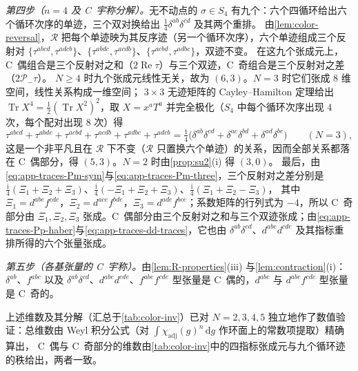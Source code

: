 \documentclass[UTF8,a4paper,11pt,fontset=fandol]{ctexart}
\makeatletter
\theoremstyle{cplain}
\theoremstyle{cdefinition}
\theoremstyle{cremark}
\renewcommand{\proofname}{证明}
\renewenvironment{proof}[1][\proofname]{\par\pushQED{\qed}\normalfont\topsep6\p@\@plus6\p@\relax
  \trivlist\item[\hskip\labelsep\itshape #1\hspace{0.5em}]\ignorespaces}{\popQED\endtrivlist\@endpefalse}
\numberwithin{equation}{section}
\DeclareMathOperator{\Tr}{Tr}
\DeclareMathOperator{\Real}{Re}
\newcommand{\dd}{\mathrm{d}}                         %
\newcommand{\Rop}{\mathcal{R}}                       %
\newcommand{\Pm}{\mathcal{P}_{-}}                    %
\newcommand{\ii}{\mathrm{i}}                        %
\makeatother
\begin{document}
\begin{proof}
\emph{第四步（$n=4$ 及 \textup{C}~宇称分解）。}无不动点的 $\sigma\in S_4$ 有九个：六个四循环给出六个循环次序的单迹，三个双对换给出 $\frac14\delta^{ab}\delta^{cd}$ 及其两个重排。
由\cref{lem:color-reversal}，$\Rop$ 把每个单迹映为其反序迹（另一个循环次序），六个单迹组成三个反射对 $\{\tau^{abcd},\tau^{adcb}\}$、$\{\tau^{abdc},\tau^{acdb}\}$、$\{\tau^{acbd},\tau^{adbc}\}$，双迹不变。
在这九个张成元上，C~偶组合是三个反射对之和（$2\Real\tau$）与三个双迹，C~奇组合是三个反射对之差（$2\Pm\tau$）。
$N\ge4$ 时九个张成元线性无关，故为 $(6,3)$。$N=3$ 时它们张成 $8$ 维空间，线性关系构成一维空间；
$3\times3$ 无迹矩阵的 Cayley--Hamilton 定理给出 $\Tr X^4=\frac12(\Tr X^2)^2$，取 $X=x^aT^a$ 并完全极化（$S_4$ 中每个循环次序出现 $4$ 次，每个配对出现 $8$ 次）得
\begin{equation}\label{eq:color-CH}
\tau^{abcd}+\tau^{abdc}+\tau^{acbd}+\tau^{acdb}+\tau^{adbc}+\tau^{adcb}=\tfrac14\bigl(\delta^{ab}\delta^{cd}+\delta^{ac}\delta^{bd}+\delta^{ad}\delta^{bc}\bigr)\qquad(N=3),
\end{equation}
这是一个非平凡且在 $\Rop$ 下不变（$\Rop$ 只置换六个单迹）的关系，因而全部关系都落在 C~偶部分，得 $(5,3)$。$N=2$ 时由\cref{prop:su2}(i) 得 $(3,0)$。
最后，由\cref{eq:app-traces-Pm-sym}与\cref{eq:app-traces-Pm-three}，三个反射对之差分别是 $\frac{\ii}{4}(\Xi_1+\Xi_2+\Xi_3)$、$\frac{\ii}{4}(-\Xi_1+\Xi_2+\Xi_3)$、$\frac{\ii}{4}(\Xi_1+\Xi_2-\Xi_3)$，
其中 $\Xi_1=d^{abe}f^{cde}$，$\Xi_2=d^{ace}f^{bde}$，$\Xi_3=d^{ade}f^{bce}$；系数矩阵的行列式为 $-4$，所以 C~奇部分由 $\Xi_1,\Xi_2,\Xi_3$ 张成。C~偶部分由三个反射对之和与三个双迹张成；由\cref{eq:app-traces-Pp-haber}与\cref{eq:app-traces-dd-traces}，它也由 $\delta^{ab}\delta^{cd}$、$d^{abe}d^{cde}$ 及其指标重排所得的六个张量张成。

\emph{第五步（各基张量的 \textup{C}~宇称）。}由\cref{lem:R-properties}(iii) 与\cref{lem:contraction}(i)：$\delta^{ab}$、$f^{abc}$ 以及 $\delta^{ab}\delta^{cd}$、$d^{abe}d^{cde}$、$f^{abe}f^{cde}$ 型张量是 C~偶的，$d^{abc}$ 与 $d^{abe}f^{cde}$ 型张量是 C~奇的。

上述维数及其分解（汇总于\cref{tab:color-inv}）已对 $N=2,3,4,5$ 独立地作了数值验证：总维数由 Weyl 积分公式（对 $\int\chi_{\mathrm{adj}}(g)^n\,\dd g$ 作环面上的常数项提取）精确算出，
C~偶与 C~奇部分的维数由\cref{tab:color-inv}中的四指标张成元与九个循环迹的秩给出，两者一致。
\end{proof}
\end{document}
